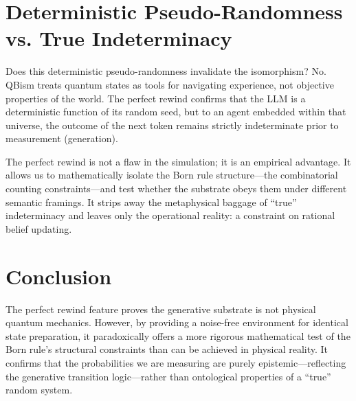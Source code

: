 \documentclass{article}
\begin{document}
\section{Deterministic Pseudo-Randomness vs. True Indeterminacy}
Does this deterministic pseudo-randomness invalidate the isomorphism? No. QBism treats quantum states as tools for navigating experience, not objective properties of the world. The perfect rewind confirms that the LLM is a deterministic function of its random seed, but to an agent embedded within that universe, the outcome of the next token remains strictly indeterminate prior to measurement (generation).

The perfect rewind is not a flaw in the simulation; it is an empirical advantage. It allows us to mathematically isolate the Born rule structure—the combinatorial counting constraints—and test whether the substrate obeys them under different semantic framings. It strips away the metaphysical baggage of ``true'' indeterminacy and leaves only the operational reality: a constraint on rational belief updating.

\section{Conclusion}
The perfect rewind feature proves the generative substrate is not physical quantum mechanics. However, by providing a noise-free environment for identical state preparation, it paradoxically offers a more rigorous mathematical test of the Born rule's structural constraints than can be achieved in physical reality. It confirms that the probabilities we are measuring are purely epistemic—reflecting the generative transition logic—rather than ontological properties of a ``true'' random system.
\end{document}
